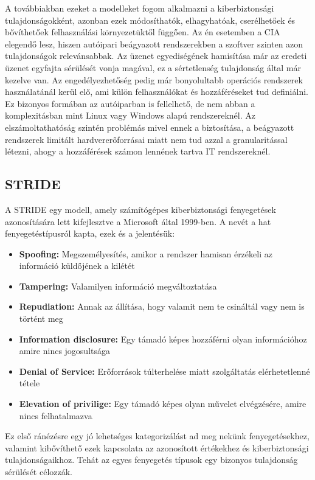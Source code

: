 A továbbiakban ezeket a modelleket fogom alkalmazni a kiberbiztonsági tulajdonságokként, azonban ezek módosíthatók, elhagyhatóak, cserélhetőek és bővíthetőek felhasználási környezetüktől függően. Az én esetemben a CIA elegendő lesz, hiszen autóipari beágyazott rendszerekben a szoftver szinten azon tulajdonságok relevánsabbak. Az üzenet egyediségének hamisítása már az eredeti üzenet egyfajta sérülését vonja magával, ez a sértetlenség tulajdonság által már kezelve van. Az engedélyezhetőség pedig már bonyolultabb operációs rendszerek használatánál kerül elő, ami külön felhasználókat és hozzáféréseket tud definiálni. Ez bizonyos formában az autóiparban is fellelhető, de nem abban a komplexitásban mint Linux vagy Windows alapú rendszereknél. Az elszámoltathatóság szintén problémás mivel ennek a biztosítása, a beágyazott rendszerek limitált hardvererőforrásai miatt nem tud azzal a granularitással létezni, ahogy a hozzáférések számon lennének tartva IT rendszereknél.

\subsection{STRIDE}
A STRIDE egy modell, amely számítógépes kiberbiztonsági fenyegetések azonosítására lett kifejlesztve a Microsoft által 1999-ben. A nevét a hat fenyegetéstípusról kapta, ezek és a jelentésük:

\begin{itemize}
    \item \textbf{Spoofing:} Megszemélyesítés, amikor a rendszer hamisan érzékeli az információ küldőjének a kilétét
    \item \textbf{Tampering:} Valamilyen információ megváltoztatása
    \item \textbf{Repudiation:} Annak az állítása, hogy valamit nem te csináltál vagy nem is történt meg
    \item \textbf{Information disclosure:} Egy támadó képes hozzáférni olyan információhoz amire nincs jogosultsága
    \item \textbf{Denial of Service:} Erőforrások túlterhelése miatt szolgáltatás elérhetetlenné tétele
    \item \textbf{Elevation of privilige:} Egy támadó képes olyan művelet elvégzésére, amire nincs felhatalmazva
\end{itemize}

Ez első ránézésre egy jó lehetséges kategorizálást ad meg nekünk fenyegetésekhez, valamint kibővíthető ezek kapcsolata az azonosított értékekhez és kiberbiztonsági tulajdonságaikhoz. Tehát az egyes fenyegetés típusok egy bizonyos tulajdonság sérülését célozzák.


